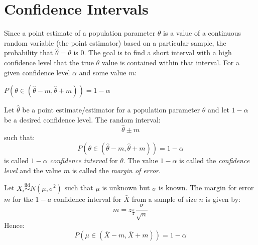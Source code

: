 \documentclass[letterpaper,12pt,fleqn]{article}
\newcommand{\iid}{\overset{\text{iid}}{\sim}}
\renewcommand{\a}{\alpha}
\renewcommand{\O}{\theta}
\newcommand{\m}{\mu}
\renewcommand{\o}{\sigma}
\newcommand{\z}[1]{z_{#1}}
\newcommand{\zdt}{\z{\frac{\a}{2}}}
\begin{document}
\section*{Confidence Intervals}

Since a point estimate of a population parameter \(\O\) is a value of a continuous random variable (the point estimator) based
on a particular sample, the probability that \(\hat{\O}=\O\) is 0.  The goal is to find a short interval with a high
confidence level that the true \(\O\) value is contained within that interval.  For a given confidence level \(\a\) and some
value \(m\):

\bigskip

\begin{center}
  \(P\left(\O\in(\hat{\O}-m,\hat{\O}+m)\right)=1-\a\)

  \bigskip

\end{center}

\begin{definition}
  Let \(\hat{\O}\) be a point estimate/estimator for a population parameter \(\O\) and let \(1-\a\) be a desired confidence
  level.  The random interval:
  \[\hat{\O}\pm m\]
  such that:
  \[P\left(\O\in(\hat{\O}-m,\hat{\O}+m)\right)=1-\a\]
  is called \(1-\a\) \emph{confidence interval} for \(\O\).  The value \(1-\a\) is called the \emph{confidence level} and
  the value \(m\) is called the \emph{margin of error}.
\end{definition}

\begin{theorem}
  Let \(X_i\iid N(\m,\o^2)\) such that \(\m\) is unknown but \(\o\) is known.  The margin for error \(m\) for the
  \(1-a\) confidence interval for \(\bar{X}\) from a sample of size \(n\) is given by:
  \[m=\zdt{\frac{\o}{\sqrt{n}}}\]
  Hence:
  \[P\left(\m\in(\bar{X}-m,\bar{X}+m)\right)=1-\a\]
\end{theorem}
\end{document}
